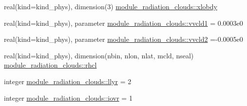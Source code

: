 \begin{DoxyCompactItemize}
\item 
real(kind=kind\+\_\+phys), dimension(3) \hyperlink{namespacemodule__radiation__clouds_aab28f783919380e5ff7f925f70355a57}{module\+\_\+radiation\+\_\+clouds\+::xlobdy}
\item 
real(kind=kind\+\_\+phys), parameter \hyperlink{namespacemodule__radiation__clouds_a6ec3c0444de53580befd4bb4d39844d3}{module\+\_\+radiation\+\_\+clouds\+::vvcld1} = 0.\+0003e0
\item 
real(kind=kind\+\_\+phys), parameter \hyperlink{namespacemodule__radiation__clouds_a67962e77fb073cc25cafaaba0c2fa833}{module\+\_\+radiation\+\_\+clouds\+::vvcld2} =-\/0.\+0005e0
\item 
real(kind=kind\+\_\+phys), dimension(nbin, nlon, nlat, mcld, nseal) \hyperlink{namespacemodule__radiation__clouds_a9673faf82ef00e0501763664743e3720}{module\+\_\+radiation\+\_\+clouds\+::rhcl}
\item 
integer \hyperlink{namespacemodule__radiation__clouds_a3390b20d42afccb3ec569a5b69a93f6e}{module\+\_\+radiation\+\_\+clouds\+::llyr} = 2
\item 
integer \hyperlink{namespacemodule__radiation__clouds_a5cfafee79e8cf066ddd8440cdfdc41a0}{module\+\_\+radiation\+\_\+clouds\+::iovr} = 1
\end{DoxyCompactItemize}
